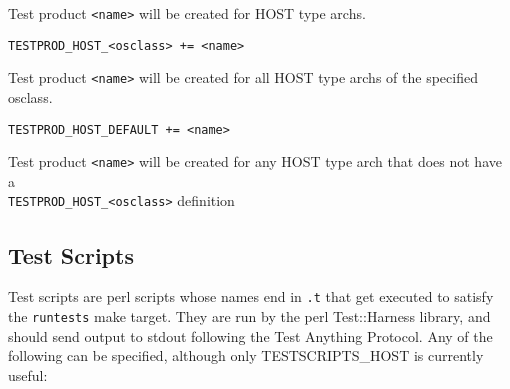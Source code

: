 \begin{description}
Test product \verb|<name>| will be created for HOST type archs.

\item \verb|TESTPROD_HOST_<osclass> += <name>|

Test product \verb|<name>| will be created for all HOST type archs of the specified osclass.

\item \verb|TESTPROD_HOST_DEFAULT += <name>|

Test product \verb|<name>| will be created for any HOST type arch that does not have a \\
\verb|TESTPROD_HOST_<osclass>| definition

\end{description}

\subsection{Test Scripts}

Test scripts are perl scripts whose names end in \verb|.t| that get executed to satisfy the \verb|runtests| make target. They are run 
by the perl Test::Harness library, and should send output to stdout following the Test Anything Protocol. Any of the 
following can be specified, although only TESTSCRIPTS\_HOST is currently useful:

